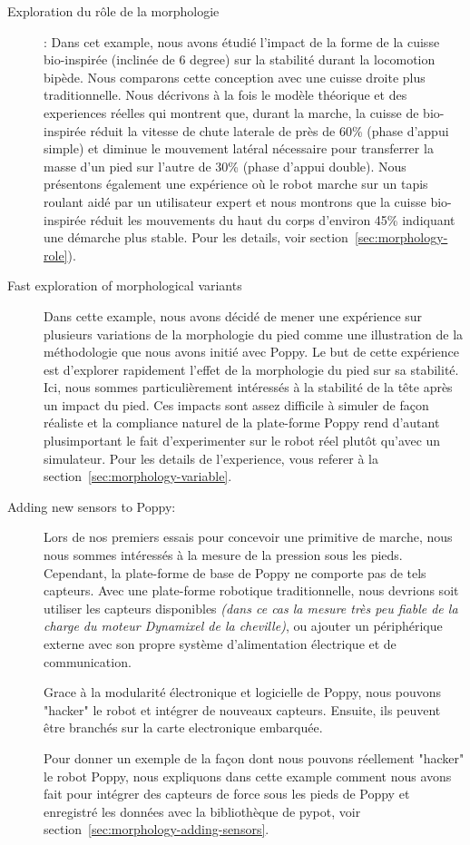 \begin{description}
    \item[Exploration du rôle de la morphologie]: Dans cet example, nous avons étudié l'impact de la forme de la cuisse bio-inspirée (inclinée de 6 degree) sur la stabilité durant la locomotion bipède. Nous comparons cette conception avec une cuisse droite plus traditionnelle. Nous décrivons à la fois le modèle théorique et des experiences réelles qui montrent que, durant la marche, la cuisse de bio-inspirée réduit la vitesse de chute laterale de près de 60\% (phase d'appui simple) et diminue le mouvement latéral nécessaire pour transferrer la  masse d'un pied sur l'autre de 30\% (phase d'appui double). Nous présentons également une expérience où le robot marche sur un tapis roulant aidé par un utilisateur expert et nous montrons que la cuisse bio-inspirée réduit les mouvements du haut du corps d'environ 45\% indiquant une démarche plus stable. Pour les details, voir section~\ref{sec:morphology-role}).

    \item[Fast exploration of morphological variants] Dans cette example, nous avons décidé de mener une expérience sur plusieurs variations de la morphologie du pied comme une illustration de la méthodologie que nous avons initié avec Poppy.
    Le but de cette expérience est d'explorer rapidement l'effet de la morphologie du pied sur sa stabilité. Ici, nous sommes particulièrement intéressés à la stabilité de la tête après un impact du pied. Ces impacts sont assez difficile à simuler de façon réaliste et la compliance naturel de la plate-forme Poppy rend d'autant plusimportant le fait d'experimenter sur le robot réel plutôt qu'avec un simulateur. Pour les details de l'experience, vous referer à la section~\ref{sec:morphology-variable}.
    \item[Adding new sensors to Poppy:]Lors de nos premiers essais pour concevoir une primitive de marche, nous nous sommes intéressés à la mesure de la pression sous les pieds. Cependant, la plate-forme de base de Poppy ne comporte pas de tels capteurs. Avec une plate-forme robotique traditionnelle, nous devrions soit utiliser les capteurs disponibles \emph{(dans ce cas la mesure très peu fiable de la charge du moteur Dynamixel de la cheville)}, ou ajouter un périphérique externe avec son propre système d'alimentation électrique et de communication.

    Grace à la modularité électronique et logicielle de Poppy, nous pouvons "hacker" le robot et intégrer de nouveaux capteurs. Ensuite, ils peuvent être branchés sur la carte electronique embarquée.

    Pour donner un exemple de la façon dont nous pouvons réellement "hacker" le robot Poppy, nous expliquons dans cette example comment nous avons fait pour intégrer des capteurs de force sous les pieds de Poppy et enregistré les données avec la bibliothèque de pypot, voir section~\ref{sec:morphology-adding-sensors}.
\end{description}

